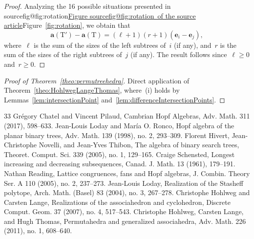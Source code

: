 \documentclass[10pt]{amsart}
\makeatletter
\theoremstyle{definition}\newtheorem{definition}[theorem]{Definition}\newtheorem{remark}[theorem]{Remark}\newtheorem{example}[theorem]{Example}
\renewcommand{\b}[1]{\mathbf{#1}} %
\newcommand{\tree}[1][T]{\mathrm{#1}} %
\newcommand{\fref}[1]{Figure~\ref{#1}} %
\renewcommand{\fref}[1]{\ifcsname sourcefig@#1\endcsname\href{https://doi.org/10.5802/alco.1}{Figure \csname sourcefig@#1\endcsname\ of the source article}\else Figure~\ref{#1}\fi}
\makeatother
\begin{document}
\begin{proof}
Analyzing the 16 possible situations presented in \fref{fig:rotation}, we obtain that
\[
\b{a}(\tree') - \b{a}(\tree) = (\ell+1)(r+1)(\b{e}_i-\b{e}_j),
\]
where~$\ell$ is the sum of the sizes of the left subtrees of~$i$ (if any), and~$r$ is the sum of the sizes of the right subtrees of~$j$ (if any). The result follows since~$\ell \ge 0$ and~$r \ge 0$.
\end{proof}
\begin{proof}[Proof of Theorem~\ref{theo:permutreehedra}]
Direct application of Theorem~\ref{theo:HohlwegLangeThomas}, where~(i) holds by Lemmas~\ref{lem:intersectionPoint} and~\ref{lem:differenceIntersectionPoints}.
\end{proof}
\begin{thebibliography}{33}
 Grégory Chatel and Vincent Pilaud, Cambrian Hopf Algebras, Adv. Math. 311 (2017), 598–633.
 Jean-Louis Loday and María O. Ronco, Hopf algebra of the planar binary trees, Adv. Math. 139 (1998), no. 2, 293–309.
 Florent Hivert, Jean-Christophe Novelli, and Jean-Yves Thibon, The algebra of binary search trees, Theoret. Comput. Sci. 339 (2005), no. 1, 129–165.
 Craige Schensted, Longest increasing and decreasing subsequences, Canad. J. Math. 13 (1961), 179–191.
 Nathan Reading, Lattice congruences, fans and Hopf algebras, J. Combin. Theory Ser. A 110 (2005), no. 2, 237–273.
 Jean-Louis Loday, Realization of the Stasheff polytope, Arch. Math. (Basel) 83 (2004), no. 3, 267–278.
 Christophe Hohlweg and Carsten Lange, Realizations of the associahedron and cyclohedron, Discrete Comput. Geom. 37 (2007), no. 4, 517–543.
 Christophe Hohlweg, Carsten Lange, and Hugh Thomas, Permutahedra and generalized associahedra, Adv. Math. 226 (2011), no. 1, 608–640.
\end{thebibliography}
\end{document}
